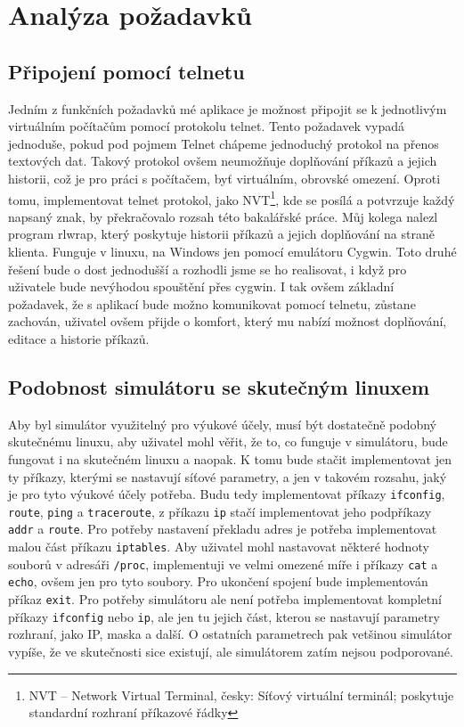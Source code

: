 
\section{Analýza požadavků}


\subsection{Připojení pomocí telnetu}

Jedním z funkčních požadavků mé aplikace je možnost připojit se k jednotlivým virtuálním počítačům pomocí protokolu telnet. Tento požadavek vypadá jednoduše, pokud pod pojmem Telnet chápeme jednoduchý protokol na přenos textových dat. Takový protokol ovšem neumožňuje doplňování příkazů a jejich historii, což je pro práci s počítačem, byť virtuálním, obrovské omezení. Oproti tomu, implementovat telnet protokol, jako NVT\footnote{NVT – Network Virtual Terminal, česky: Síťový virtuální terminál; poskytuje standardní rozhraní příkazové řádky}, kde se posílá a potvrzuje každý napsaný znak, by překračovalo rozsah této bakalářské práce. Můj kolega nalezl program rlwrap, který poskytuje historii příkazů a jejich doplňování na straně klienta. Funguje v linuxu, na Windows jen pomocí emulátoru Cygwin. Toto druhé řešení bude o dost jednodušší a rozhodli jsme se ho realisovat, i když pro uživatele bude nevýhodou spouštění přes cygwin. I tak ovšem základní požadavek, že s aplikací bude možno komunikovat pomocí telnetu, zůstane zachován, uživatel ovšem přijde o komfort, který mu nabízí možnost doplňování, editace a historie příkazů. 


\subsection{Podobnost simulátoru se skutečným linuxem}

Aby byl simulátor využitelný pro výukové účely, musí být dostatečně podobný skutečnému linuxu, aby uživatel mohl věřit, že to, co funguje v simulátoru, bude fungovat i na skutečném linuxu a naopak. K tomu bude stačit implementovat jen ty příkazy, kterými se nastavují síťové parametry, a jen v takovém rozsahu, jaký je pro tyto výukové účely potřeba. Budu tedy implementovat příkazy \verb|ifconfig|, \verb|route|, \verb|ping| a \verb|traceroute|, z příkazu \verb|ip| stačí implementovat jeho podpříkazy \verb|addr| a \verb|route|. Pro potřeby nastavení překladu adres je potřeba implementovat malou část příkazu \verb|iptables|. Aby uživatel mohl nastavovat některé hodnoty souborů v adresáři \verb|/proc|, implementuji ve velmi omezené míře i příkazy \verb|cat| a \verb|echo|, ovšem jen pro tyto soubory. Pro ukončení spojení bude implementován příkaz \verb|exit|. Pro potřeby simulátoru ale není potřeba implementovat kompletní příkazy \verb|ifconfig| nebo \verb|ip|, ale jen tu jejich část, kterou se nastavují parametry rozhraní, jako IP, maska a další. O ostatních parametrech pak vetšinou simulátor vypíše, že ve skutečnosti sice existují, ale simulátorem zatím nejsou podporované.


